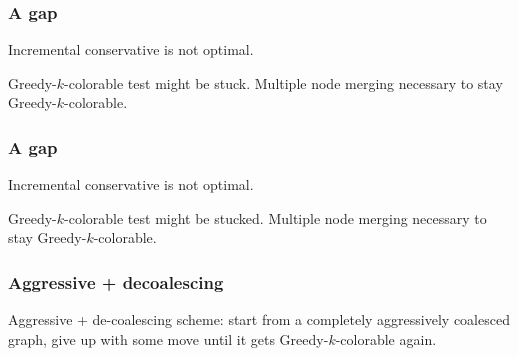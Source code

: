 \begin{frame}[label=past]
  \frametitle{A gap}
  Incremental conservative is not optimal. 
  \begin{block}{}
  Greedy-$k$-colorable test might be stuck. Multiple node merging necessary to stay Greedy-$k$-colorable.
\end{block}
%

\end{frame}
%
\begin{frame}[label=past]
  \frametitle{A gap}
  Incremental conservative is not optimal. 
  \begin{block}{}
  Greedy-$k$-colorable test might be stucked. Multiple node merging necessary to stay Greedy-$k$-colorable.
\end{block}
{\vspace{2.5cm}}%
\end{frame}
%
\begin{frame}[label=past]
  \frametitle{Aggressive + decoalescing}
\begin{block}{}
\alert{Aggressive + de-coalescing} scheme: start from a completely aggressively coalesced graph, give up with some move until it gets Greedy-$k$-colorable again. 
\end{block}
  \vspace{2.5cm}
\end{frame}


